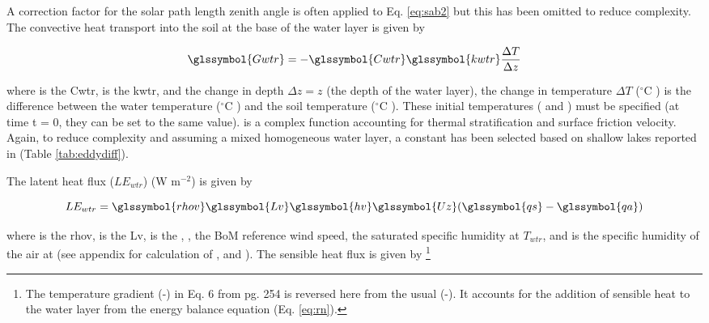 \documentclass[final,3p,times,authoryear]{elsarticle}
\newcommand{\degreeC}{\ensuremath{^\circ}C }
\begin{document}
A correction factor for the solar path length zenith angle is often applied to Eq. \ref{eq:sab2} \citep{MolinaMartinez2006} but this has been omitted to reduce complexity. The convective heat transport  into the soil at the base of the water layer is given by \citep{MolinaMartinez2006}

\begin{equation} 
\glssymbol{Gwtr} = - \glssymbol{Cwtr} \glssymbol{kwtr} \frac{\Delta T}{\Delta z}
\label{eq:gwtr} \end{equation} 


where  is the \glsdesc{Cwtr},  is the \glsdesc{kwtr}, 
and the change in depth $\Delta z = z$ (the depth of the water layer), the change in temperature $\Delta T$ (\degreeC) is the difference between the water temperature  (\degreeC) and the soil temperature  (\degreeC). These initial temperatures ( and ) must be specified (at time t = 0, they can be set to the same value).  is a complex function accounting for thermal stratification and surface friction velocity. Again, to reduce complexity and assuming a mixed homogeneous water layer, a constant  has been selected based on shallow lakes reported in \cite{SalasDeLeon2016} (Table \ref{tab:eddydiff}).


The latent heat flux ($LE_{wtr}$) (W m$^{-2}$) is given by \citep{Arya2001}

\begin{equation} 
LE_{wtr} = \glssymbol{rhov} \glssymbol{Lv} \glssymbol{hv} \glssymbol{Uz} (\glssymbol{qs} - \glssymbol{qa})
\label{eq:lewtr} \end{equation} 


where  is the \glsdesc{rhov},  is the \glsdesc{Lv},  is the  \citep{Jones2005,Hicks1972}, , the BoM reference wind speed,  the saturated specific humidity at $T_{wtr}$, and  is the specific humidity of the air at  (see appendix for calculation of ,  and ). The sensible heat flux is given by \cite{MolinaMartinez2006}\footnote{The temperature gradient (-) in Eq. 6 from \cite{MolinaMartinez2006} pg. 254 is reversed here from the usual (-). It accounts for the addition of sensible heat to the water layer from the energy balance equation (Eq. \ref{eq:rn}).}
\end{document}
